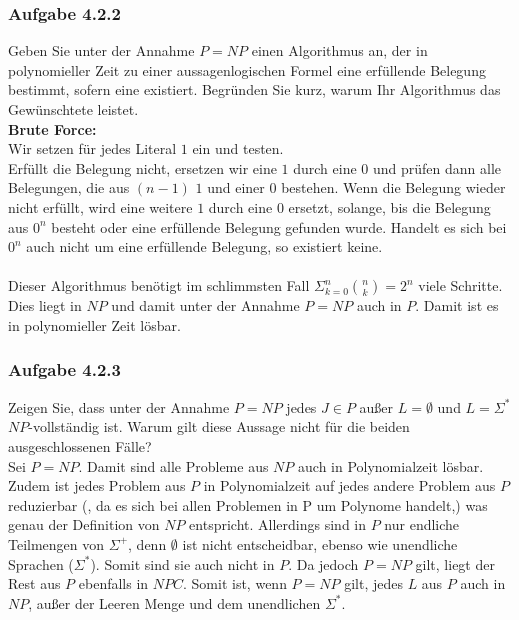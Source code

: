 \documentclass{article}
\begin{document}
\subsubsection{Aufgabe 4.2.2}
\label{4.2.2}
Geben Sie unter der Annahme $P=NP$ einen Algorithmus an, der in polynomieller Zeit zu einer aussagenlogischen Formel eine erfüllende Belegung bestimmt, sofern eine existiert.
Begründen Sie kurz, warum Ihr Algorithmus das Gewünschtete leistet.
\vspace{1cm}\-\\
\textbf{Brute Force:}\\
Wir setzen für jedes Literal $1$ ein und testen.\\
Erfüllt die Belegung nicht, ersetzen wir eine $1$ durch eine $0$ und prüfen dann alle Belegungen, die aus $(n-1)$ $1$ und einer $0$ bestehen.
Wenn die Belegung wieder nicht erfüllt, wird eine weitere $1$ durch eine $0$ ersetzt, solange, bis die Belegung aus $0^n$ besteht oder eine erfüllende Belegung gefunden wurde.
Handelt es sich bei $0^n$ auch nicht um eine erfüllende Belegung, so existiert keine.\\
\-\\
Dieser Algorithmus benötigt im schlimmsten Fall $\Sigma ^n_{k=0} \binom{n}{k} = 2^n$ viele Schritte.
Dies liegt in $NP$ und damit unter der Annahme $P = NP$ auch in $P$.
Damit ist es in polynomieller Zeit lösbar.

\subsubsection{Aufgabe 4.2.3}
Zeigen Sie, dass unter der Annahme $P=NP$ jedes $J \in P$ außer $L=\emptyset$ und $L=\Sigma^*$ $NP$-vollständig ist.
Warum gilt diese Aussage nicht für die beiden ausgeschlossenen Fälle?
\vspace{1cm}\-\\
Sei $P = NP$.
Damit sind alle Probleme aus $NP$ auch in Polynomialzeit lösbar.
Zudem ist jedes Problem aus $P$ in Polynomialzeit auf jedes andere Problem aus $P$ reduzierbar (, da es sich bei allen Problemen in P um Polynome handelt,) was genau der Definition von $NP$ entspricht.
Allerdings sind in $P$ nur endliche Teilmengen von $\Sigma^+$, denn $\emptyset$ ist nicht entscheidbar, ebenso wie unendliche Sprachen ($\Sigma^*$).
Somit sind sie auch nicht in $P$.
Da jedoch $P = NP$ gilt, liegt der Rest aus $P$ ebenfalls in $NPC$.
Somit ist, wenn $P = NP$ gilt, jedes $L$ aus $P$ auch in $NP$, außer der Leeren Menge und dem unendlichen $\Sigma^*$.
\end{document}
